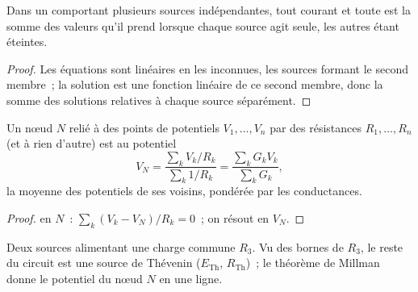 \begin{theorem}[Superposition]\label{thm:b1:dc-circuits:superposition}
Dans un  comportant plusieurs sources indépendantes,
tout courant et toute  est la somme des valeurs qu'il prend
lorsque chaque source agit seule, les autres étant éteintes.
\end{theorem}

\begin{proof}
Les équations sont linéaires en les inconnues, les sources formant le
second membre~; la solution est une fonction linéaire de ce second
membre, donc la somme des solutions relatives à chaque source séparément.
\end{proof}

\begin{proposition}\label{prop:b1:dc-circuits:millman}
Un nœud $N$ relié à des points de potentiels $V_1, \dots, V_n$ par des
résistances $R_1, \dots, R_n$ (et à rien d'autre) est au potentiel
\[
V_N = \frac{\sum_k V_k/R_k}{\sum_k 1/R_k} = \frac{\sum_k G_k V_k}{\sum_k G_k},
\]
la moyenne des potentiels de ses voisins, pondérée par les conductances.
\end{proposition}

\begin{proof}
 en $N$~: $\sum_k (V_k - V_N)/R_k = 0$~; on résout en $V_N$.
\end{proof}

\begin{omfigure}

{\small Deux sources alimentant une charge commune $R_3$. Vu des bornes
de $R_3$, le reste du circuit est une source de Thévenin
($E_{\mathrm{Th}}$, $R_{\mathrm{Th}}$)~; le théorème de Millman donne le
potentiel du nœud $N$ en une ligne.}
\end{omfigure}


